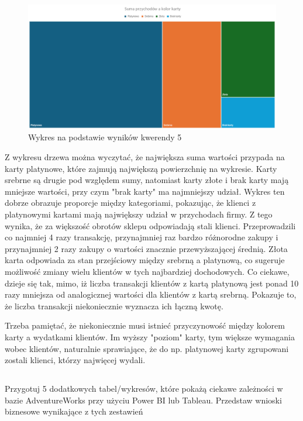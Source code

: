 \documentclass[a4paper,12pt]{article}
\begin{document}
\begin{figure}[H]
    \centering
    \includegraphics[width=1.0\textwidth]{images/excel/05.png}
    \caption{Wykres na podstawie wyników kwerendy 5}
\end{figure}

Z wykresu drzewa można wyczytać, że największa suma wartości przypada na karty platynowe, które zajmują największą powierzchnię na wykresie. Karty srebrne są drugie pod względem sumy, natomiast karty złote i brak karty mają mniejsze wartości, przy czym "brak karty" ma najmniejszy udział. Wykres ten dobrze obrazuje proporcje między kategoriami, pokazując, że klienci z platynowymi kartami mają największy udział w przychodach firmy. Z tego wynika, że za większość obrotów sklepu odpowiadają stali klienci. Przeprowadzili co najmniej 4 razy transakcję, przynajmniej raz bardzo różnorodne zakupy i przynajmniej 2 razy zakupy o wartości znacznie przewyższającej średnią. Złota karta odpowiada za stan przejściowy między srebrną a platynową, co sugeruje możliwość zmiany wielu klientów w tych najbardziej dochodowych. Co ciekawe, dzieje się tak, mimo, iż liczba transakcji klientów z kartą platynową jest ponad 10 razy mniejsza od analogicznej wartości dla klientów z kartą srebrną. Pokazuje to, że liczba transakcji niekoniecznie wyznacza ich łączną kwotę.

Trzeba pamiętać, że niekoniecznie musi istnieć przyczynowość między kolorem karty a wydatkami klientów. Im wyższy "poziom" karty, tym większe wymagania wobec klientów, naturalnie sprawiające, że do np. platynowej karty zgrupowani zostali klienci, którzy najwięcej wydali.

\subsection{}

Przygotuj 5 dodatkowych tabel/wykresów, które pokażą ciekawe zależności w bazie AdventureWorks przy użyciu Power BI lub Tableau. Przedstaw wnioski biznesowe wynikające z tych zestawień
\end{document}
